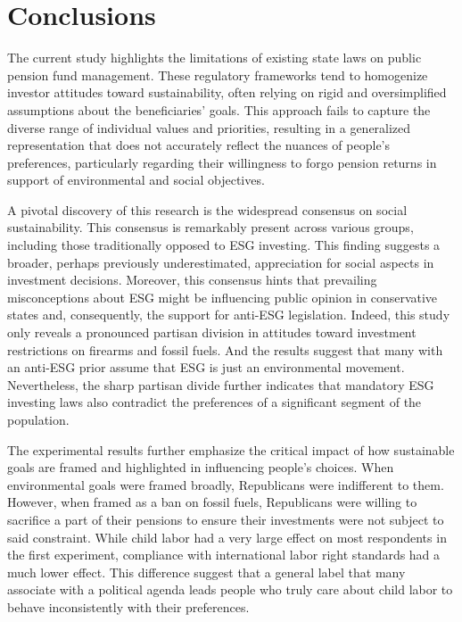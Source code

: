\documentclass[
  12pt,
]{article}
\begin{document}
\hypertarget{conclusions}{%
\section{Conclusions}\label{conclusions}}

The current study highlights the limitations of existing state laws on public pension fund management. These regulatory frameworks tend to homogenize investor attitudes toward sustainability, often relying on rigid and oversimplified assumptions about the beneficiaries' goals. This approach fails to capture the diverse range of individual values and priorities, resulting in a generalized representation that does not accurately reflect the nuances of people's preferences, particularly regarding their willingness to forgo pension returns in support of environmental and social objectives.

A pivotal discovery of this research is the widespread consensus on social sustainability. This consensus is remarkably present across various groups, including those traditionally opposed to ESG investing. This finding suggests a broader, perhaps previously underestimated, appreciation for social aspects in investment decisions. Moreover, this consensus hints that prevailing misconceptions about ESG might be influencing public opinion in conservative states and, consequently, the support for anti-ESG legislation. Indeed, this study only reveals a pronounced partisan division in attitudes toward investment restrictions on firearms and fossil fuels. And the results suggest that many with an anti-ESG prior assume that ESG is just an environmental movement. Nevertheless, the sharp partisan divide further indicates that mandatory ESG investing laws also contradict the preferences of a significant segment of the population.

The experimental results further emphasize the critical impact of how sustainable goals are framed and highlighted in influencing people's choices. When environmental goals were framed broadly, Republicans were indifferent to them. However, when framed as a ban on fossil fuels, Republicans were willing to sacrifice a part of their pensions to ensure their investments were not subject to said constraint. While child labor had a very large effect on most respondents in the first experiment, compliance with international labor right standards had a much lower effect. This difference suggest that a general label that many associate with a political agenda leads people who truly care about child labor to behave inconsistently with their preferences.
\end{document}
